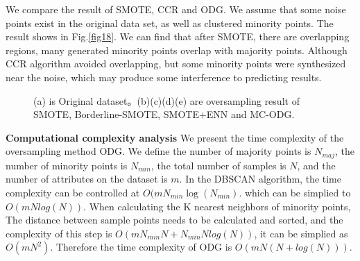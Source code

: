\documentclass[ida]{iosart2x}
\begin{document}
We compare the result of SMOTE, CCR and ODG. We assume that some noise points exist in the original data set, 
as well as clustered minority points. The result shows in Fig.\ref{fig18}. 
We can find that after SMOTE, there are overlapping regions, many generated minority points 
overlap with majority points.
Although CCR algorithm avoided overlapping, 
but some minority points were synthesized near the noise, which may produce some interference to predicting results.
\begin{figure}[tb]
  \centering
  \quad
  \quad

  \quad
  \quad
  \caption{(a) is Original dataset。(b)(c)(d)(e) are oversampling result of SMOTE, 
  Borderline-SMOTE, SMOTE+ENN and MC-ODG.}
  \label{fig17}
  \end{figure}

\textbf{Computational complexity analysis}
We present the time complexity of the oversampling method ODG.
We define the number of majority points is $N_{maj}$, 
the number of minority points is $N_{min}$, the total number of samples is $N$, 
and the number of attributes on the dataset is $m$.
In the DBSCAN algorithm, the time complexity can be controlled at $O(mN_{min}\log(N_{min})$.
which can be simplied to $O(mNlog(N))$.
When calculating the K nearest neighbors of minority points,
The distance between sample points needs to be calculated and sorted, and the complexity of this step is
$O(mN_{min}N+N_{min}Nlog(N))$, it can be simplied as $O(mN^2)$. Therefore the time complexity of
ODG is $O(mN(N+log(N)))$.
\end{document}
